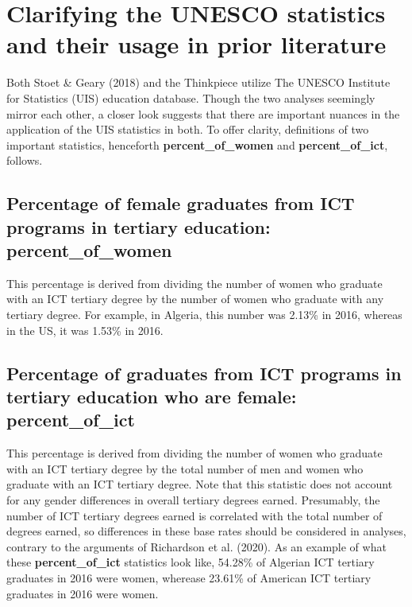 \documentclass[]{book}
\begin{document}
\section{Clarifying the UNESCO statistics and their usage in prior
literature}\label{clarifying-the-unesco-statistics-and-their-usage-in-prior-literature}

Both Stoet \& Geary (2018) and the Thinkpiece utilize The UNESCO
Institute for Statistics (UIS) education database. Though the two
analyses seemingly mirror each other, a closer look suggests that there
are important nuances in the application of the UIS statistics in both.
To offer clarity, definitions of two important statistics, henceforth
\textbf{percent\_of\_women} and \textbf{percent\_of\_ict}, follows.

\subsection{\texorpdfstring{Percentage of female graduates from ICT
programs in tertiary education:
\textbf{percent\_of\_women}}{Percentage of female graduates from ICT programs in tertiary education: percent\_of\_women}}\label{percentage-of-female-graduates-from-ict-programs-in-tertiary-education-percent_of_women}

This percentage is derived from dividing the number of women who
graduate with an ICT tertiary degree by the number of women who graduate
with any tertiary degree. For example, in Algeria, this number was
2.13\% in 2016, whereas in the US, it was 1.53\% in 2016.

\subsection{\texorpdfstring{Percentage of graduates from ICT programs in
tertiary education who are female:
\textbf{percent\_of\_ict}}{Percentage of graduates from ICT programs in tertiary education who are female: percent\_of\_ict}}\label{percentage-of-graduates-from-ict-programs-in-tertiary-education-who-are-female-percent_of_ict}

This percentage is derived from dividing the number of women who
graduate with an ICT tertiary degree by the total number of men and
women who graduate with an ICT tertiary degree. Note that this statistic
does not account for any gender differences in overall tertiary degrees
earned. Presumably, the number of ICT tertiary degrees earned is
correlated with the total number of degrees earned, so differences in
these base rates should be considered in analyses, contrary to the
arguments of Richardson et al. (2020). As an example of what these
\textbf{percent\_of\_ict} statistics look like, 54.28\% of Algerian ICT
tertiary graduates in 2016 were women, wherease 23.61\% of American ICT
tertiary graduates in 2016 were women.
\end{document}
